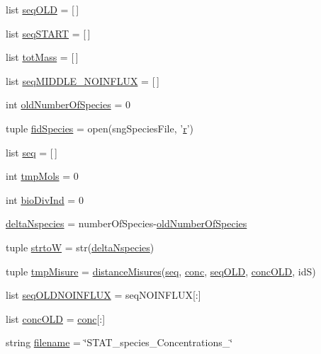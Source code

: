 \begin{DoxyCompactItemize}
\item 
list \hyperlink{a00098_a55e3b17fd716a4b1e28e7b9d93f1943c}{seq\-O\-L\-D} = \mbox{[}$\,$\mbox{]}
\item 
list \hyperlink{a00098_a648282264cfc8a40cf84141f9f59781f}{seq\-S\-T\-A\-R\-T} = \mbox{[}$\,$\mbox{]}
\item 
list \hyperlink{a00098_ac2ecae6789d89cc56b0a731065837774}{tot\-Mass} = \mbox{[}$\,$\mbox{]}
\item 
list \hyperlink{a00098_a8fd1a0445b2e641363a96da5a7e7159b}{seq\-M\-I\-D\-D\-L\-E\-\_\-\-N\-O\-I\-N\-F\-L\-U\-X} = \mbox{[}$\,$\mbox{]}
\item 
int \hyperlink{a00098_abe1ce9bb85ee916d2046efc5c3fe6b30}{old\-Number\-Of\-Species} = 0
\item 
tuple \hyperlink{a00098_afd34aa2ef2c410c2d71007bac0a121fd}{fid\-Species} = open(sng\-Species\-File, '\hyperlink{a00025_ac862e7284527eb913b1351c8bfb8e079}{r}')
\item 
list \hyperlink{a00098_a22eec19fcd0da474a136cfe97438ae3b}{seq} = \mbox{[}$\,$\mbox{]}
\item 
int \hyperlink{a00098_aa24f8efad70335a8460f68902001ce64}{tmp\-Mols} = 0
\item 
int \hyperlink{a00098_a247328d05f06695b0c2de9a001ca4548}{bio\-Div\-Ind} = 0
\item 
\hyperlink{a00098_a555117703c3245ec7d3d73f5d991c8c5}{delta\-Nspecies} = number\-Of\-Species-\/\hyperlink{a00098_abe1ce9bb85ee916d2046efc5c3fe6b30}{old\-Number\-Of\-Species}
\item 
tuple \hyperlink{a00098_abe05028c33fab522e3b940195eaaa586}{strto\-W} = str(\hyperlink{a00098_a555117703c3245ec7d3d73f5d991c8c5}{delta\-Nspecies})
\item 
tuple \hyperlink{a00098_a45529ce20ca353ca8ac251b4e88c91ff}{tmp\-Misure} = \hyperlink{a00098_a76768d52780b1415a920dc94b3c991c0}{distance\-Misures}(\hyperlink{a00098_a22eec19fcd0da474a136cfe97438ae3b}{seq}, \hyperlink{a00021_a941dee33725f074478fdcbf15e1c35ae}{conc}, \hyperlink{a00098_a55e3b17fd716a4b1e28e7b9d93f1943c}{seq\-O\-L\-D}, \hyperlink{a00098_a15f99c617a2dc95e52f741ee99e71b7a}{conc\-O\-L\-D}, id\-S)
\item 
list \hyperlink{a00098_ac796dfff897c2b81d04e71e4f3306d16}{seq\-O\-L\-D\-N\-O\-I\-N\-F\-L\-U\-X} = seq\-N\-O\-I\-N\-F\-L\-U\-X\mbox{[}\-:\mbox{]}
\item 
list \hyperlink{a00098_a15f99c617a2dc95e52f741ee99e71b7a}{conc\-O\-L\-D} = \hyperlink{a00021_a941dee33725f074478fdcbf15e1c35ae}{conc}\mbox{[}\-:\mbox{]}
\item 
string \hyperlink{a00098_a69b59a10e5dc62a6e0d5325e9a27e5c6}{filename} = \char`\"{}S\-T\-A\-T\-\_\-species\-\_\-\-Concentrations\-\_\-\char`\"{}
\end{DoxyCompactItemize}


